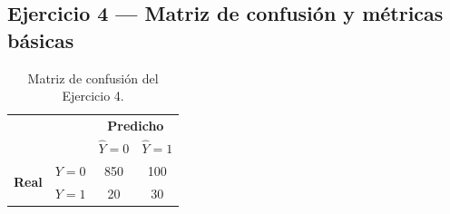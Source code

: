 \subsection{Ejercicio 4 --- Matriz de confusión y métricas básicas}

\begin{table}[H]
\centering
\begin{tabular}{cc|cc}
    & & \multicolumn{2}{c}{\textbf{Predicho}} \\
    & & $\hat Y = 0$ & $\hat Y = 1$ \\
    \hline
    \multirow{2}{*}{\textbf{Real}}
    & $Y=0$ & 850 & 100 \\
    & $Y=1$ & 20  & 30  \\
\end{tabular}
\caption{Matriz de confusión del Ejercicio 4.}
\end{table}

